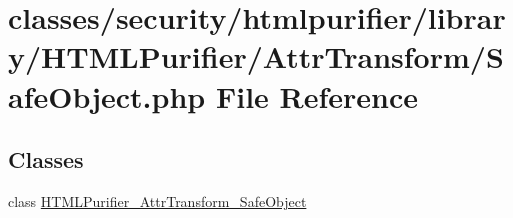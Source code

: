 \hypertarget{AttrTransform_2SafeObject_8php}{\section{classes/security/htmlpurifier/library/\+H\+T\+M\+L\+Purifier/\+Attr\+Transform/\+Safe\+Object.php File Reference}
\label{AttrTransform_2SafeObject_8php}
}
\subsection*{Classes}
\begin{DoxyCompactItemize}
\item 
class \hyperlink{classHTMLPurifier__AttrTransform__SafeObject}{H\+T\+M\+L\+Purifier\+\_\+\+Attr\+Transform\+\_\+\+Safe\+Object}
\end{DoxyCompactItemize}
